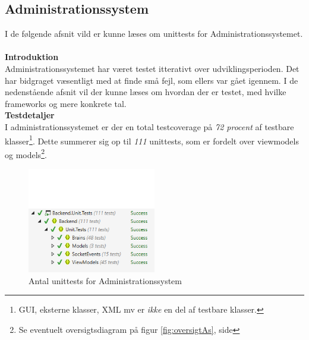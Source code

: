 \subsection{Administrationssystem}
I de følgende afsnit vild er kunne læses om unittests for Administrationssystemet.\\\\


\textbf{Introduktion}\\
Administrationssystemet har været testet itterativt over udviklingsperioden. Det har bidgraget væsentligt med at finde små fejl, som ellers var gået igennem. I de nedenstående afsnit vil der kunne læses om hvordan der er testet, med hvilke frameworks og mere konkrete tal.\\



\textbf{Testdetaljer}\\
I administrationssystemet er der en total testcoverage på \textit{72 procent} af testbare klasser\footnote{GUI, eksterne klasser, XML mv er \textit{ikke} en del af testbare klasser.}. Dette summerer sig op til \textit{111} unittests, som er fordelt over viewmodels og models\footnote{Se eventuelt oversigtsdiagram på figur \ref{fig:oversigtAs}, side \pageref{fig:oversigtAs}}. 

	\begin{figure}[H]
		\centering
		\includegraphics[width=0.50\textwidth]{Test/Images/Backend/AntalUnit.png}
		\caption{Antal unittests for Administrationssystem}
		\label{fig:antalunit}
	\end{figure}

